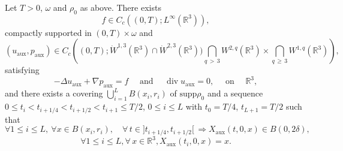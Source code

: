 \documentclass[10pt]{amsart}
\theoremstyle{definition}\newtheorem{defi}[theo]{Definition}\newtheorem{rema}[theo]{Remark}\newtheorem{exam}[theo]{Example}\newtheorem{exem}[theo]{Example}\newtheorem{nota}[theo]{Notation}
\newcommand{\supp}{\mathrm{supp} }
\newcommand{\aux}{\mathrm{aux}}
\newcommand{\R}{\mathbb{R}}
\renewcommand{\leq}{\leqslant}
\renewcommand{\geq}{\geqslant}
\renewcommand{\div}{\operatorname{div}}
\let\oldforall\forall
\renewcommand*{\forall}{\mathrel{\oldforall}}
\begin{document}
\begin{prop}\label{lemme1}
Let $T>0$, $\omega$ and $\rho_0$ as above. There exists
\[
f\in C_c\left((0,T);L^\infty\left(\R^3\right)\right),
\]
compactly supported in $(0,T)\times \omega$ and
\[
(u_\aux,p_{\aux}) \in C_c\left((0,T);\dot{W}^{1,3}\left(\R^3\right)\cap \dot{W}^{2,3}\left(\R^3\right))\bigcap_{q\,>\,3} W^{2,q}\left(\R^3\right) \times \bigcap_{q\,\geq\,3}W^{1,q}\left(\R^3\right)\right),
\]
satisfying
\[
-\Delta u_\aux +\nabla p_\aux = f \quad \text{ and } \quad \div u_\aux=0,
\quad \text{ on } \quad \R^3,
\]
and there exists a covering ${{\bigcup}_{i=1}^{L}} B(x_i,r_i)$ of $\supp \rho_0$ and a sequence $0\leq t_i<t_{i+1/4}<t_{i+1/2}<t_{i+1}\leq T/2$, $0\leq i \leq L $ with $t_0=T/4$, $t_{L+1}=T/2$ such that
\begin{equation}\label{forumule_controle_zone}
\forall 1 \leq i \leq L,\: \forall x\in B(x_i, r_i), \quad \forall \, t \in]t_{i+1/4},t_{i+1/2}[\,\Rightarrow X_\aux(t,0,x)\in B(0,2\delta),
\end{equation}
\[
\forall 1 \leq i \leq L, \forall\, x \in \R^3, X_{\aux}(t_i,0,x)=x.
\]
\end{prop}
\end{document}
